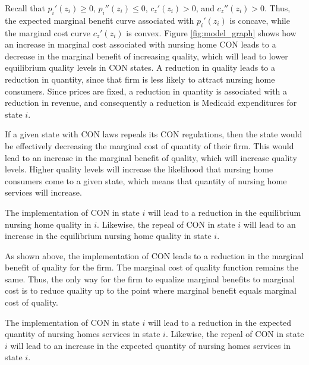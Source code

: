 \documentclass[../Main.tex]{subfiles}
\begin{document}
Recall that $p_{i}'(z_i)\geq 0$, $p_{i}''(z_i) \leq 0$, $c_z'(z_i)>0$, and $c_z''(z_i)>0$. Thus, the expected marginal benefit curve associated with $p_{i}'(z_i)$ is concave, while the marginal cost curve $c_z'(z_i)$ is convex. Figure \ref{fig:model_graph} shows how an increase in marginal cost associated with nursing home CON leads to a decrease in the marginal benefit of increasing quality, which will lead to lower equilibrium quality levels in CON states. A reduction in quality leads to a reduction in quantity, since that firm is less likely to attract nursing home consumers. Since prices are fixed, a reduction in quantity is associated with a reduction in revenue, and consequently a reduction is Medicaid expenditures for state $i$. 

If a given state with CON laws repeals its CON regulations, then the state would be effectively decreasing the marginal cost of quantity of their firm. This would lead to an increase in the marginal benefit of quality, which will increase quality levels. Higher quality levels will increase the likelihood that nursing home consumers come to a given state, which means that quantity of nursing home services will increase.



\begin{Proposition}
The implementation of CON in state $i$ will lead to a reduction in the equilibrium nursing home quality in $i$. Likewise, the repeal of CON in state $i$ will lead to an increase in the equilibrium nursing home quality in state $i$. 
\end{Proposition}


As shown above, the implementation of CON leads to a reduction in the marginal benefit of quality for the firm. The marginal cost of quality function remains the same. Thus, the only way for the firm to equalize marginal benefits to marginal cost is to reduce quality up to the point where marginal benefit equals marginal cost of quality. 

\begin{Proposition}
The implementation of CON in state $i$ will lead to a reduction in the expected quantity of nursing homes services in state $i$. Likewise, the repeal of CON in state $i$ will lead to an increase in the expected quantity of nursing homes services in state $i$. 
\end{Proposition}
\end{document}
